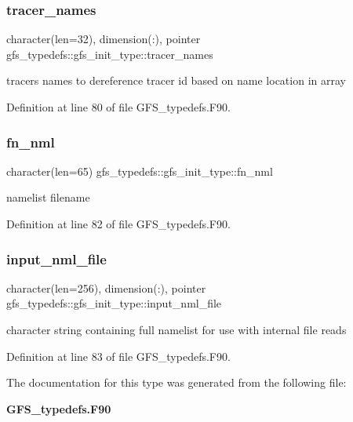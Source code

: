 \subsubsection{tracer\+\_\+names}
{\footnotesize\ttfamily character(len=32), dimension(\+:), pointer gfs\+\_\+typedefs\+::gfs\+\_\+init\+\_\+type\+::tracer\+\_\+names}



tracers names to dereference tracer id based on name location in array 



Definition at line 80 of file G\+F\+S\+\_\+typedefs.\+F90.

\mbox{\label{structgfs__typedefs_1_1gfs__init__type_aedbf134446e4f6082b462e2c2a7beb26}} 
\subsubsection{fn\+\_\+nml}
{\footnotesize\ttfamily character(len=65) gfs\+\_\+typedefs\+::gfs\+\_\+init\+\_\+type\+::fn\+\_\+nml}



namelist filename 



Definition at line 82 of file G\+F\+S\+\_\+typedefs.\+F90.

\mbox{\label{structgfs__typedefs_1_1gfs__init__type_a459c0cf6fb901a408429e941cc6be209}} 
\subsubsection{input\+\_\+nml\+\_\+file}
{\footnotesize\ttfamily character(len=256), dimension(\+:), pointer gfs\+\_\+typedefs\+::gfs\+\_\+init\+\_\+type\+::input\+\_\+nml\+\_\+file}



character string containing full namelist for use with internal file reads 



Definition at line 83 of file G\+F\+S\+\_\+typedefs.\+F90.



The documentation for this type was generated from the following file\+:\begin{DoxyCompactItemize}
\item 
\textbf{ G\+F\+S\+\_\+typedefs.\+F90}\end{DoxyCompactItemize}
